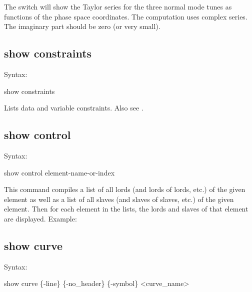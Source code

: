 {{{{{{{{{The  switch will show the Taylor series for the three normal mode tunes as functions 
of the phase space coordinates. The computation uses complex series. The imaginary part should 
be zero (or very small).



\subsection{show constraints}
\label{s:show.constraints}

Syntax:
\begin{example}
  show constraints
\end{example}

Lists data and variable constraints. Also see .


\subsection{show control}
\label{s:show.control}

Syntax:
\begin{example}
  show control {element-name-or-index}
\end{example}

This command compiles a list of all lords (and lords of lords, etc.) of the given element as well as
a list of all slaves (and slaves of slaves, etc.) of the given element. Then for each element in the
lists, the lords and slaves of that element are displayed. Example:


\subsection{show curve}
\label{s:show.curve}

Syntax:
\begin{example}
  show curve \{-line\} \{-no_header\} \{-symbol\} <curve_name>
\end{example}

}}}}}}}}}
